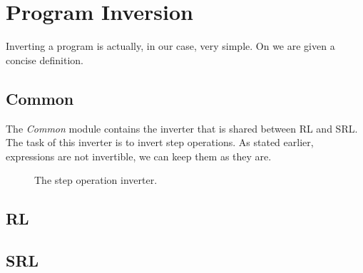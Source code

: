 \section{Program Inversion}

Inverting a program is actually, in our case, very simple. On \cite[p.~104]{REV} we are given a concise definition.

\subsection{Common}

The \textit{Common} module contains the inverter that is shared between RL and SRL. The task of this inverter is to invert step operations. As stated earlier, expressions are not invertible, we can keep them as they are.

\begin{figure}[H]
  
  \caption{The step operation inverter.}\label{fig:srlinterp}
\end{figure}

\subsection{RL}

\subsection{SRL}
